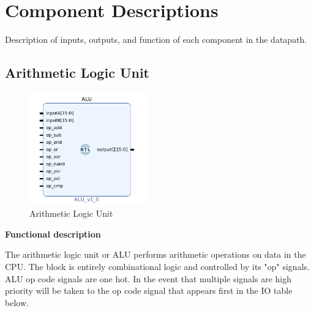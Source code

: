 \documentclass{article}
\begin{document}
\newpage

\section{Component Descriptions}
\label{compd}
\begin{par}
	
	Description of inputs, outputs, and function of each component in the datapath. 
	
	\subsection{Arithmetic Logic Unit}
	
	\begin{figure}[H]
		\centering
		\includegraphics[width=2in]{img/alu.png}
		\caption{Arithmetic Logic Unit}
	\end{figure}

	\textbf{Functional description}
	\begin{par}
		The arithmetic logic unit or ALU performs arithmetic operations on data in the CPU. The block is entirely combinational logic and controlled by its "op" signals. ALU op code signals are one hot. In the event that multiple signals are high priority will be taken to the op code signal that appears first in the IO table below.  
	\end{par}
	

\end{par}
\end{document}
